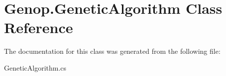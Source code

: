\hypertarget{classGenop_1_1GeneticAlgorithm}{}\section{Genop.\+Genetic\+Algorithm Class Reference}
\label{classGenop_1_1GeneticAlgorithm}


The documentation for this class was generated from the following file\+:\begin{DoxyCompactItemize}
\item 
Genetic\+Algorithm.\+cs\end{DoxyCompactItemize}
